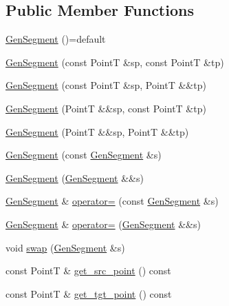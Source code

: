 \subsection*{Public Member Functions}
\begin{DoxyCompactItemize}
\item 
\hyperlink{class_designar_1_1_gen_segment_ab57969fe5adbc572d437709946c0999d}{Gen\+Segment} ()=default
\item 
\hyperlink{class_designar_1_1_gen_segment_a3735dbb7660ebba6d82a977eaee42ed8}{Gen\+Segment} (const PointT \&sp, const PointT \&tp)
\item 
\hyperlink{class_designar_1_1_gen_segment_a504a48917f78ebaae01c2a1a598d1700}{Gen\+Segment} (const PointT \&sp, PointT \&\&tp)
\item 
\hyperlink{class_designar_1_1_gen_segment_a6190cba1e40d5d18dc1853368da957dc}{Gen\+Segment} (PointT \&\&sp, const PointT \&tp)
\item 
\hyperlink{class_designar_1_1_gen_segment_a23414f22da354141bd2b8084ec178556}{Gen\+Segment} (PointT \&\&sp, PointT \&\&tp)
\item 
\hyperlink{class_designar_1_1_gen_segment_a9e40cf0ac50d71260609e0414f55f580}{Gen\+Segment} (const \hyperlink{class_designar_1_1_gen_segment}{Gen\+Segment} \&s)
\item 
\hyperlink{class_designar_1_1_gen_segment_a32578eb470796720847b126b378affed}{Gen\+Segment} (\hyperlink{class_designar_1_1_gen_segment}{Gen\+Segment} \&\&s)
\item 
\hyperlink{class_designar_1_1_gen_segment}{Gen\+Segment} \& \hyperlink{class_designar_1_1_gen_segment_a05ecd015b8b917ea85971069d999b7a7}{operator=} (const \hyperlink{class_designar_1_1_gen_segment}{Gen\+Segment} \&s)
\item 
\hyperlink{class_designar_1_1_gen_segment}{Gen\+Segment} \& \hyperlink{class_designar_1_1_gen_segment_a8a49c8cbca57eff43564bfe71f869485}{operator=} (\hyperlink{class_designar_1_1_gen_segment}{Gen\+Segment} \&\&s)
\item 
void \hyperlink{class_designar_1_1_gen_segment_ac597d1811abeb7c572dfd81363c0d120}{swap} (\hyperlink{class_designar_1_1_gen_segment}{Gen\+Segment} \&s)
\item 
const PointT \& \hyperlink{class_designar_1_1_gen_segment_a6366ec701132bf900b1211576ef5f0dd}{get\+\_\+src\+\_\+point} () const
\item 
const PointT \& \hyperlink{class_designar_1_1_gen_segment_a90e9ef8bf940d22202814a1ba3d118f2}{get\+\_\+tgt\+\_\+point} () const
\item 

\end{DoxyCompactItemize}
